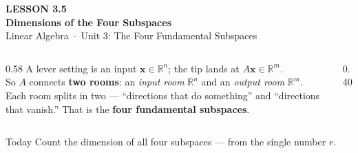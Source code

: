 \documentclass[aspectratio=169, 11pt]{beamer}
\newcommand{\xx}{\mathbf{x}}
\begin{document}
{
\begin{frame}[plain]
  \vspace{2.8cm}\hspace{0.55cm}%
  \begin{minipage}{0.9\textwidth}
    {\color{goldacc}\bfseries\small LESSON 3.5}\\[0.5cm]
    {\color{white}\bfseries\LARGE Dimensions of the Four Subspaces}\\[1.0cm]
    {\color{blushmid}\small Linear Algebra~$\cdot$~Unit 3: The Four Fundamental Subspaces}
  \end{minipage}
\end{frame}
}

\begin{frame}[t, plain]
  \begin{columns}[T]
    \begin{column}{0.58\textwidth}
      A lever setting is an input $\xx\in\mathbb{R}^n$; the tip lands at $A\xx\in\mathbb{R}^m$.\\[6pt]
      So $A$ connects \textbf{two rooms}: an \emph{input room} $\mathbb{R}^n$ and an \emph{output room}
      $\mathbb{R}^m$.\\[6pt]
      Each room splits in two --- ``directions that do something'' and ``directions that vanish.'' That is
      the \textbf{four fundamental subspaces}.
    \end{column}
    \begin{column}{0.40\textwidth}
      \centering
    \end{column}
  \end{columns}
  \vspace{2pt}
  \begin{block}{Today}
    Count the dimension of all four subspaces --- from the single number $r$.
  \end{block}
\end{frame}
\end{document}
